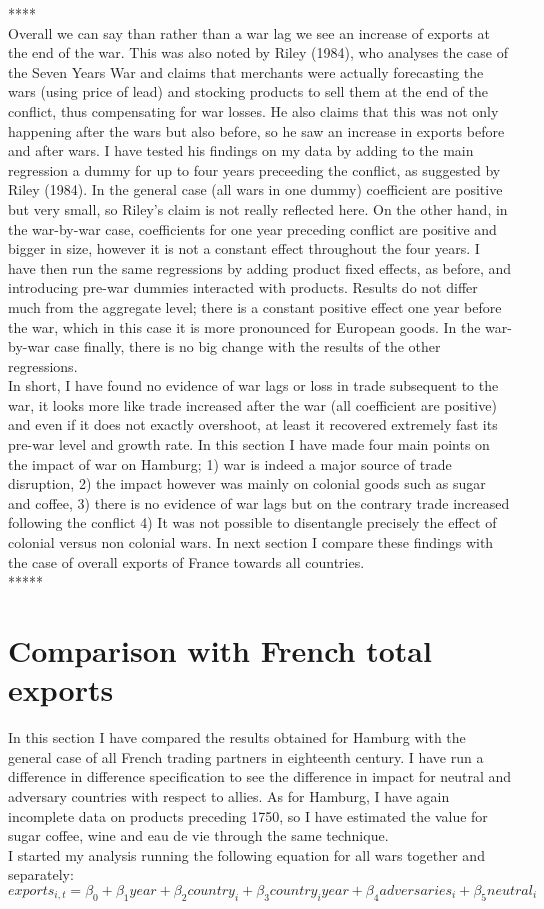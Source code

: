 \documentclass[12pt,a4paper,titlepage]{article}
\begin{document}
****\\
Overall we can say than rather than a war lag we see an increase of exports at the end of the war. This was also noted by Riley (1984), who analyses the case of the Seven Years War and claims that merchants were actually forecasting the wars (using price of lead) and stocking products to sell them at the end of the conflict, thus compensating for war losses. He also claims that this was not only happening after the wars but also before, so he saw an increase in exports before and after wars. I have tested his findings on my data by adding to the main regression a dummy for up to four years preceeding the conflict, as suggested by Riley (1984). In the general case (all wars in one dummy) coefficient are positive but very small, so Riley’s claim is not really reflected here. On the other hand, in the war-by-war case, coefficients for one year preceding conflict are positive and bigger in size, however it is not a constant effect throughout the four years. 
I have then run the same regressions by adding product fixed effects, as before, and introducing pre-war dummies interacted with products. Results do not differ much from the aggregate level; there is a constant positive effect one year before the war, which in this case it is more pronounced for European goods. In the war-by-war case finally, there is no big change with the results of the other regressions. \\
In short, I have found no evidence of war lags or loss in trade subsequent to the war, it looks more like trade increased after the war (all coefficient are positive) and even if it does not exactly overshoot, at least it recovered extremely fast its pre-war level and growth rate. 
In this section I have made four main points on the impact of war on Hamburg; 1) war is indeed a major source of trade disruption, 2) the impact however was mainly on colonial goods such as sugar and coffee, 3) there is no evidence of war lags but on the contrary trade increased following the conflict 4) It was not possible to disentangle precisely the effect of colonial versus non colonial wars. In next section I compare these findings with the case of overall exports of France towards all countries. \\
*****
\section{Comparison with French total exports}
In this section I have compared the results obtained for Hamburg with the general case of all French trading partners in eighteenth century. I have run a difference in difference specification to see the difference in impact for neutral and adversary countries with respect to allies. As for Hamburg, I have again incomplete data on products preceding 1750, so I have estimated the value for sugar coffee, wine and eau de vie through the same technique. \\
I started my analysis running the following equation for all wars together and separately:
\begin{equation}
exports_{i,t}=\beta_0+\beta_1year + \beta_2country_i+\beta_3country_iyear+\beta_4adversaries_i+\beta_5neutral_i
\end{equation}
\end{document}

